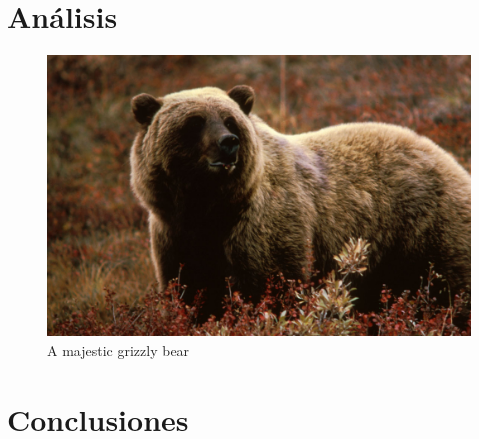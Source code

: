 \documentclass[10pt, a4paper]{article}%
\begin{document}
\begin{multicols}{2}
\section{Análisis}

\begin{figure}
	\includegraphics[width=\linewidth]{bear.jpg} %
	\caption{A majestic grizzly bear} %
	\label{bear} %
\end{figure}

\section{Conclusiones}


\printbibliography[title={Bibliography}] %

\end{multicols}
\end{document}
